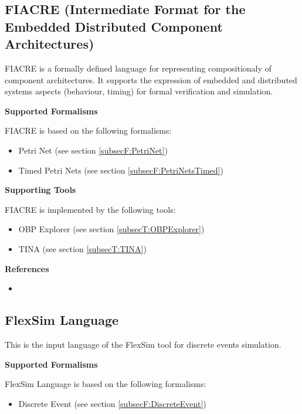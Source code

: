 \subsection{FIACRE (Intermediate Format for the Embedded Distributed Component Architectures)}
\label{subsecL:FIACRE}


FIACRE is a formally defined language for representing compositionaly of component architectures.
It supports the expression of embedded and distributed systems aspects (behaviour, timing) for formal verification and simulation.

\textbf{Supported Formalisms}

FIACRE is based on the following formalisms:
\begin{itemize}
	\item Petri Net (see section \ref{subsecF:PetriNet})
	\item Timed Petri Nets (see section \ref{subsecF:PetriNetsTimed})
\end{itemize}


\textbf{Supporting Tools}

FIACRE is implemented by the following tools:
\begin{itemize}
	\item OBP Explorer (see section \ref{subsecT:OBPExplorer})
	\item TINA (see section \ref{subsecT:TINA})
\end{itemize}


\textbf{References}
\begin{itemize}
	
\item {}
\end{itemize}



\subsection{FlexSim Language}
\label{subsecL:FlexSimLanguage}


This is the input language of the FlexSim tool for discrete events simulation.

\textbf{Supported Formalisms}

FlexSim Language is based on the following formalisms:
\begin{itemize}
	\item Discrete Event (see section \ref{subsecF:DiscreteEvent})
\end{itemize}


